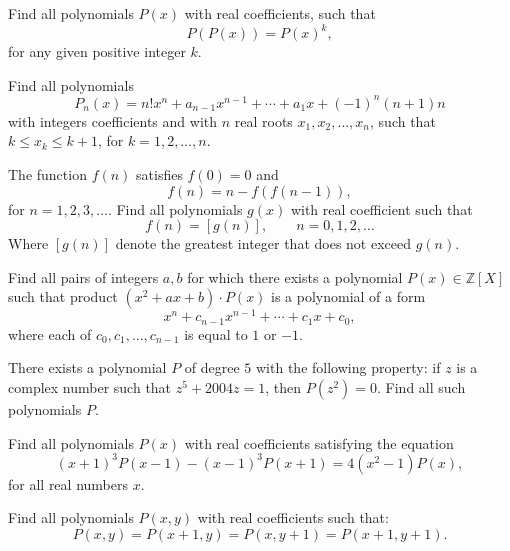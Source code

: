 \documentclass[12pt,a4paper]{memoir}
\theoremstyle{definition}
\begin{document}
\begin{question}
	Find all polynomials $P(x)$ with real coefficients, such that \[P(P(x))=P(x)^k,\] for any given positive integer $k$.
\end{question}





\begin{question}
	Find all polynomials 
	\[P_{n}(x)=n!x^n + a_{n-1}x^{n-1}+\cdots+ a_{1}x +(-1)^n(n+1)n\]
	with integers coefficients and with $n$ real roots $x_1, x_2, \dots, x_n$, such that $k\leq x_k\leq k+1$, for $k=1,2,\dots,n$.
\end{question}





\begin{question}
	The function $f(n)$ satisfies $f(0)=0$ and \[f(n)=n-f \left( f(n-1) \right),\] for $n=1,2,3, \dots$. Find all polynomials $g(x)$ with real coefficient such that
	\[ f(n)= [ g(n) ], \qquad n=0,1,2, \dots \]
	Where $[ g(n) ]$ denote the greatest integer that does not exceed $g(n)$.
\end{question}





\begin{question}
	Find all pairs of integers $a,b$ for which there exists a polynomial $P(x) \in \mathbb{Z}[X]$ such that product $(x^2+ax+b)\cdot P(x)$ is a polynomial of a form \[ x^n+c_{n-1}x^{n-1}+\cdots+c_1x+c_0,  \] where each of $c_0,c_1,\dots,c_{n-1}$ is equal to $1$ or $-1$.
\end{question}





\begin{question}
	There exists a polynomial $P$ of degree $5$ with the following property: if $z$ is a complex number such that $z^{5}+2004z=1$, then $P(z^{2})=0$. Find all such polynomials $P$.
\end{question}





\begin{question}
	Find all polynomials $P(x)$ with real coefficients satisfying the equation \[(x+1)^{3}P(x-1)-(x-1)^{3}P(x+1)=4(x^{2}-1) P(x),\] for all real numbers $x$.
\end{question}


\begin{question}
	Find all polynomials $P(x,y)$ with real coefficients such that:
	\[P(x,y)=P(x+1,y)=P(x,y+1)=P(x+1,y+1).\]
\end{question}
\end{document}
